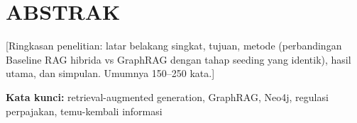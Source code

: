 \chapter*{ABSTRAK}

[Ringkasan penelitian: latar belakang singkat, tujuan, metode (perbandingan
Baseline RAG hibrida vs GraphRAG dengan tahap seeding yang identik), hasil utama,
dan simpulan. Umumnya 150--250 kata.]

\vspace{0.5cm}
\noindent\textbf{Kata kunci:} retrieval-augmented generation, GraphRAG, Neo4j,
regulasi perpajakan, temu-kembali informasi
